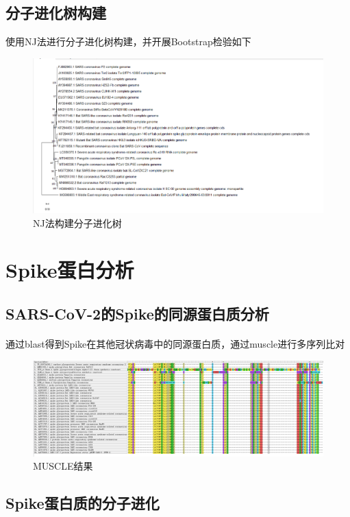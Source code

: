 \documentclass[supercite]{HustGraduPaper}
\begin{document}
  \subsection{分子进化树构建}使用NJ法进行分子进化树构建，并开展Bootstrap检验如下
	\begin{figure}[H]
		\centering
		\includegraphics[width=1\textwidth]{./material/practice3/mega.png}
		\caption{NJ法构建分子进化树}
	\end{figure}


\section{Spike蛋白分析}
  \subsection{SARS-CoV-2的Spike的同源蛋白质分析}
	  \paragraph{}\label{subpara:subpara}通过blast得到Spike在其他冠状病毒中的同源蛋白质，通过muscle进行多序列比对
		\begin{figure}[H]
			\centering
			\includegraphics[width=1\textwidth]{./material/practice4/muscle.png}
			\caption{MUSCLE结果}
		\end{figure}


	\subsection{Spike蛋白质的分子进化}
\end{document}
